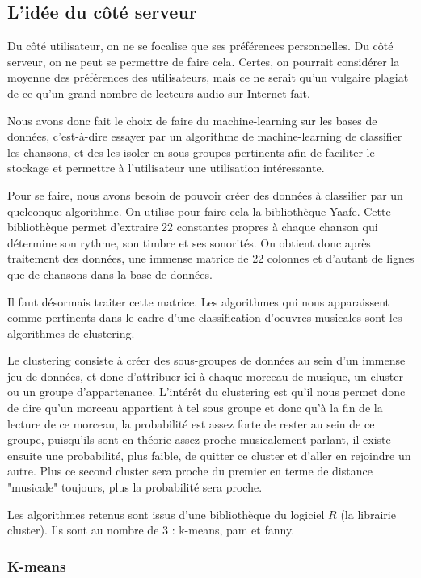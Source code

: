 \documentclass{report}
\begin{document}
\subsection{L'idée du côté serveur}

Du côté utilisateur, on ne se focalise que ses préférences personnelles. Du côté serveur, on ne peut se permettre de faire cela. Certes, on pourrait considérer la moyenne des préférences des utilisateurs, mais ce ne serait qu'un vulgaire plagiat de ce qu'un grand nombre de lecteurs audio sur Internet fait.

Nous avons donc fait le choix de faire du machine-learning sur les bases de données, c'est-à-dire essayer par un algorithme de machine-learning de classifier les chansons, et des les isoler en sous-groupes pertinents afin de faciliter le stockage et permettre à l'utilisateur une utilisation intéressante.

Pour se faire, nous avons besoin de pouvoir créer des données à classifier par un quelconque algorithme. On utilise pour faire cela la bibliothèque Yaafe. Cette bibliothèque permet d'extraire 22 constantes propres à chaque chanson qui détermine son rythme, son timbre et ses sonorités. On obtient donc après traitement des données, une immense matrice de 22 colonnes et d'autant de lignes que de chansons dans la base de données.

Il faut désormais traiter cette matrice. Les algorithmes qui nous apparaissent comme pertinents dans le cadre d'une classification d'oeuvres musicales sont les algorithmes de clustering.

Le clustering consiste à créer des sous-groupes de données au sein d'un immense jeu de données, et donc d'attribuer ici à chaque morceau de musique, un cluster ou un groupe d'appartenance. L'intérêt du clustering est qu'il nous permet donc de dire qu'un morceau appartient à tel sous groupe et donc qu'à la fin de la lecture de ce morceau, la probabilité est assez forte de rester au sein de ce groupe, puisqu'ils sont en théorie assez proche musicalement parlant, il existe ensuite une probabilité, plus faible, de quitter ce cluster et d'aller en rejoindre un autre. Plus ce second cluster sera proche du premier en terme de distance "musicale" toujours, plus la probabilité sera proche.


Les algorithmes retenus sont issus d'une bibliothèque du logiciel $R$ (la librairie cluster). Ils sont au nombre de 3 : k-means, pam et fanny.

\subsubsection{K-means}
\end{document}
